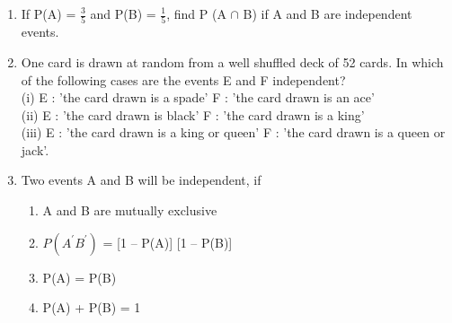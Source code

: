 \begin{enumerate}[label=\thesection.\arabic*.,ref=\thesection.\theenumi]
\item If P(A) = $\frac{3}{5}$ and P(B) = $\frac{1}{5}$, find P (A $\cap$ B) if A and B are independent events.\\\solution

\item One card is drawn at random from a well shuffled deck of 52 cards. In which of the following cases are the events E and F independent?\\
(i) E : 'the card drawn is a spade'
F : 'the card drawn is an ace'\\
(ii) E : 'the card drawn is black'
F : 'the card drawn is a king'\\
(iii) E : 'the card drawn is a king or queen'
F : 'the card drawn is a queen or jack'.\\
\solution

\item Two events A and B will be independent, if
\begin{enumerate}
\item A and B are mutually exclusive
\item $P(A^{\prime}B^{\prime})$ = [1 – P(A)] [1 – P(B)]
\item P(A) = P(B)
\item P(A) + P(B) = 1
\end{enumerate}
\solution

\end{enumerate}

